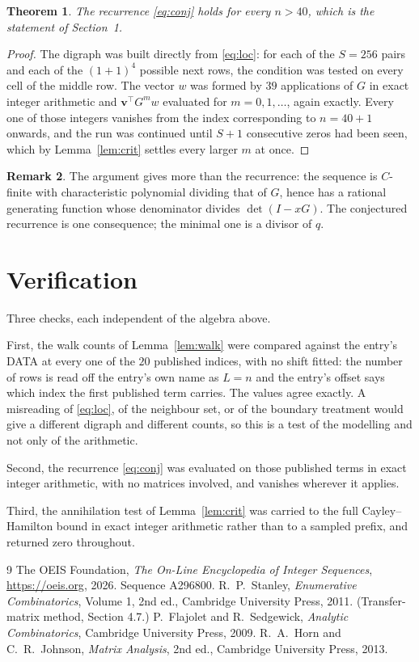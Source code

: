 \documentclass[11pt,a4paper]{article}
\theoremstyle{plain}
\newtheorem{theorem}{Theorem}
\theoremstyle{definition}
\newtheorem{remark}[theorem]{Remark}
\begin{document}
\begin{theorem}
The recurrence \eqref{eq:conj} holds for every $n>40$, which is the statement of
Section~1.
\end{theorem}

\begin{proof}
The digraph was built directly from \eqref{eq:loc}: for each of the $S=256$ pairs and each
of the $(1+1)^{4}$ possible next rows, the condition was tested on every cell of
the middle row. The vector $w$ was formed by $39$ applications of $G$ in exact integer
arithmetic and $\mathbf{v}^{\!\top}G^{m}w$ evaluated for $m=0,1,\dots$, again exactly.
Every one of those integers vanishes from the index corresponding to $n=40+1$ onwards,
and the run was continued until $S+1$ consecutive zeros had been seen, which by
Lemma~\ref{lem:crit} settles every larger $m$ at once.
\end{proof}

\begin{remark}
The argument gives more than the recurrence: the sequence is $C$-finite with characteristic
polynomial dividing that of $G$, hence has a rational generating function whose denominator
divides $\det(I-xG)$. The conjectured recurrence is one consequence; the minimal one is a
divisor of $q$.
\end{remark}

\section{Verification}

Three checks, each independent of the algebra above.

First, the walk counts of Lemma~\ref{lem:walk} were compared against the entry's DATA at
every one of the $20$ published indices, with no shift fitted: the number of rows is
read off the entry's own name as $L=n$ and the entry's offset says which index the first
published term carries. The values agree exactly. A misreading of \eqref{eq:loc}, of the
neighbour set, or of the boundary treatment would give a different digraph and different
counts, so this is a test of the modelling and not only of the arithmetic.

Second, the recurrence \eqref{eq:conj} was evaluated on those published terms in exact
integer arithmetic, with no matrices involved, and vanishes wherever it applies.

Third, the annihilation test of Lemma~\ref{lem:crit} was carried to the full
Cayley--Hamilton bound in exact integer arithmetic rather than to a sampled prefix, and
returned zero throughout.

\begin{thebibliography}{9}
 The OEIS Foundation, \emph{The On-Line Encyclopedia of Integer
Sequences}, \url{https://oeis.org}, 2026. Sequence A296800.
 R.~P.~Stanley, \emph{Enumerative Combinatorics}, Volume 1, 2nd ed.,
Cambridge University Press, 2011. (Transfer-matrix method, Section 4.7.)
 P.~Flajolet and R.~Sedgewick, \emph{Analytic Combinatorics}, Cambridge
University Press, 2009.
 R.~A.~Horn and C.~R.~Johnson, \emph{Matrix Analysis}, 2nd ed., Cambridge
University Press, 2013.
\end{thebibliography}
\end{document}
